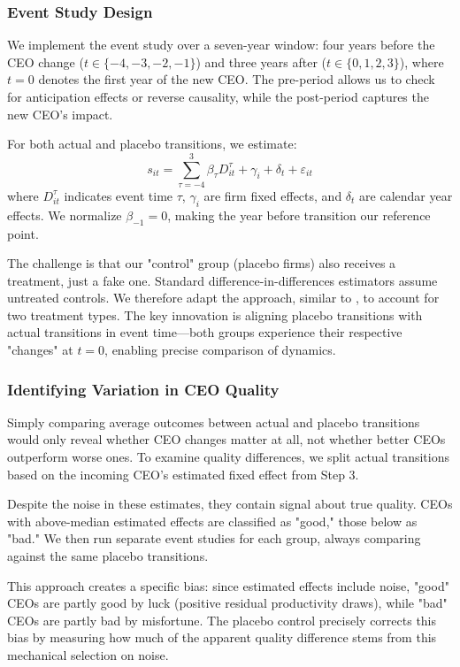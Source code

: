 \documentclass[11pt,a4paper]{article}
\begin{document}
\subsubsection{Event Study Design}

We implement the event study over a seven-year window: four years before the CEO change ($t \in \{-4, -3, -2, -1\}$) and three years after ($t \in \{0, 1, 2, 3\}$), where $t=0$ denotes the first year of the new CEO. The pre-period allows us to check for anticipation effects or reverse causality, while the post-period captures the new CEO's impact.

For both actual and placebo transitions, we estimate:
\begin{equation}
s_{it} = \sum_{\tau=-4}^{3} \beta_\tau D_{it}^\tau + \gamma_i + \delta_t + \varepsilon_{it}
\end{equation}
where $D_{it}^\tau$ indicates event time $\tau$, $\gamma_i$ are firm fixed effects, and $\delta_t$ are calendar year effects. We normalize $\beta_{-1} = 0$, making the year before transition our reference point.

The challenge is that our "control" group (placebo firms) also receives a treatment, just a fake one. Standard difference-in-differences estimators assume untreated controls. We therefore adapt the approach, similar to \citet{Callaway2021JoLE}, to account for two treatment types. The key innovation is aligning placebo transitions with actual transitions in event time—both groups experience their respective "changes" at $t=0$, enabling precise comparison of dynamics.

\subsubsection{Identifying Variation in CEO Quality}

Simply comparing average outcomes between actual and placebo transitions would only reveal whether CEO changes matter at all, not whether better CEOs outperform worse ones. To examine quality differences, we split actual transitions based on the incoming CEO's estimated fixed effect from Step 3.

Despite the noise in these estimates, they contain signal about true quality. CEOs with above-median estimated effects are classified as "good," those below as "bad." We then run separate event studies for each group, always comparing against the same placebo transitions.

This approach creates a specific bias: since estimated effects include noise, "good" CEOs are partly good by luck (positive residual productivity draws), while "bad" CEOs are partly bad by misfortune. The placebo control precisely corrects this bias by measuring how much of the apparent quality difference stems from this mechanical selection on noise.
\end{document}
